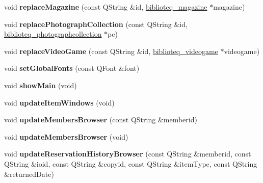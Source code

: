 \begin{DoxyCompactItemize}
\item 
void {\bfseries replace\+Magazine} (const Q\+String \&id, \hyperlink{classbiblioteq__magazine}{biblioteq\+\_\+magazine} $\ast$magazine)\hypertarget{classbiblioteq_a72beeff6b5eee53f977a686258c0b10f}{}\label{classbiblioteq_a72beeff6b5eee53f977a686258c0b10f}

\item 
void {\bfseries replace\+Photograph\+Collection} (const Q\+String \&id, \hyperlink{classbiblioteq__photographcollection}{biblioteq\+\_\+photographcollection} $\ast$pc)\hypertarget{classbiblioteq_a87358d5db660dec1c31d39a4142eee02}{}\label{classbiblioteq_a87358d5db660dec1c31d39a4142eee02}

\item 
void {\bfseries replace\+Video\+Game} (const Q\+String \&id, \hyperlink{classbiblioteq__videogame}{biblioteq\+\_\+videogame} $\ast$videogame)\hypertarget{classbiblioteq_a1fa674db3d30a09869c462d64d218164}{}\label{classbiblioteq_a1fa674db3d30a09869c462d64d218164}

\item 
void {\bfseries set\+Global\+Fonts} (const Q\+Font \&font)\hypertarget{classbiblioteq_a40009f0c4c0e42a784749d41a9e0c7ba}{}\label{classbiblioteq_a40009f0c4c0e42a784749d41a9e0c7ba}

\item 
void {\bfseries show\+Main} (void)\hypertarget{classbiblioteq_a4b14ed8e19b0f98c22a4dafde90a8baa}{}\label{classbiblioteq_a4b14ed8e19b0f98c22a4dafde90a8baa}

\item 
void {\bfseries update\+Item\+Windows} (void)\hypertarget{classbiblioteq_a8e5d924b22bd5bbff09605e2c4274e6f}{}\label{classbiblioteq_a8e5d924b22bd5bbff09605e2c4274e6f}

\item 
void {\bfseries update\+Members\+Browser} (const Q\+String \&memberid)\hypertarget{classbiblioteq_ae0b6755aa5ec54fe2cb5bb6842f95a55}{}\label{classbiblioteq_ae0b6755aa5ec54fe2cb5bb6842f95a55}

\item 
void {\bfseries update\+Members\+Browser} (void)\hypertarget{classbiblioteq_af25cd59010d3b98dc840d399602a24d5}{}\label{classbiblioteq_af25cd59010d3b98dc840d399602a24d5}

\item 
void {\bfseries update\+Reservation\+History\+Browser} (const Q\+String \&memberid, const Q\+String \&ioid, const Q\+String \&copyid, const Q\+String \&item\+Type, const Q\+String \&returned\+Date)\hypertarget{classbiblioteq_adc5582f65430cb8e7c4fde7c61c6ceb6}{}\label{classbiblioteq_adc5582f65430cb8e7c4fde7c61c6ceb6}


\end{DoxyCompactItemize}
